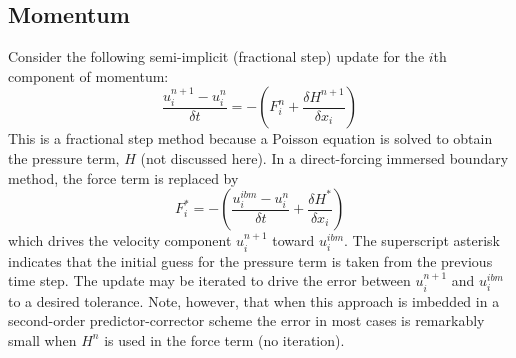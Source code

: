 \documentclass[12pt]{article}
\begin{document}
%
%
%
%
%
%
%
%
%
%
%


\subsection{Momentum}
\label{sec:momentum}

Consider the following semi-implicit (fractional step) update for the $i$th component of momentum:
\begin{equation}
\label{eqn:mom}
\frac{u_i^{n+1} - u_i^n}{\delta t} = -\left(F_i^n + \frac{\delta H^{n+1}}{\delta x_i}\right)
\end{equation}
This is a fractional step method because a Poisson equation is solved to obtain the pressure term, $H$ (not discussed here). In a direct-forcing immersed boundary method, the force term is replaced by
\begin{equation}
\label{eqn:force}
F_i^* = - \left( \frac{u_i^{ibm} - u_i^n}{\delta t} + \frac{\delta H^*}{\delta x_i}\right)
\end{equation}
which drives the velocity component $u_i^{n+1}$ toward $u_i^{ibm}$.  The superscript asterisk indicates that the initial guess for the pressure term is taken from the previous time step.  The update may be iterated to drive the error between $u_i^{n+1}$ and $u_i^{ibm}$ to a desired tolerance.  Note, however, that when this approach is imbedded in a second-order predictor-corrector scheme the error in most cases is remarkably small when $H^n$ is used in the force term (no iteration).
\end{document}
